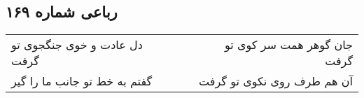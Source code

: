 \begin{center}
\section*{رباعی شماره ۱۶۹}
\label{sec:sh169}
\begin{longtable}{l p{0.5cm} r}
دل عادت و خوی جنگجوی تو گرفت
&&
جان گوهر همت سر کوی تو گرفت
\\
گفتم به خط تو جانب ما را گیر
&&
آن هم طرف روی نکوی تو گرفت
\\
\end{longtable}
\end{center}
